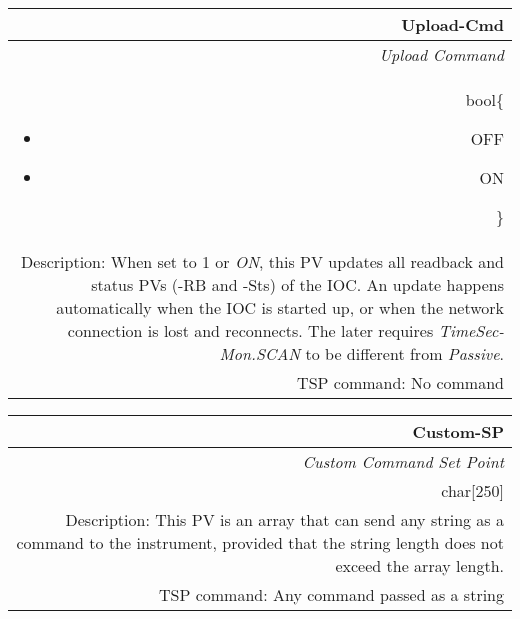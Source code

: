 \documentclass[openany]{article}
\begin{document}
		\begin{tabular}{N}
			\hline
			\bfseries Upload-Cmd\label{pv:upload-cmd} \\ \hline
			\emph{Upload Command} \\
			bool\{\begin{itemize}[noitemsep]
				\small
				\item[] OFF
				\item[] ON
			\end{itemize}\} \\
			Description: When set to 1 or \emph{ON}, this PV updates all readback and status PVs (-RB and -Sts) of the IOC. An update happens automatically when the IOC is started up, or when the network connection is lost and reconnects. The later requires \emph{TimeSec-Mon.SCAN} to be different from \emph{Passive}. \\
			TSP command: No command
		\end{tabular}

		\begin{tabular}{N}
			\hline
			\bfseries Custom-SP\label{pv:custom-sp} \\ \hline
			\emph{Custom Command Set Point} \\
			char[250] \\
			Description: This PV is an array that can send any string as a command to the instrument, provided that the string length does not exceed the array length. \\
			TSP command: Any command passed as a string
		\end{tabular}
\end{document}
